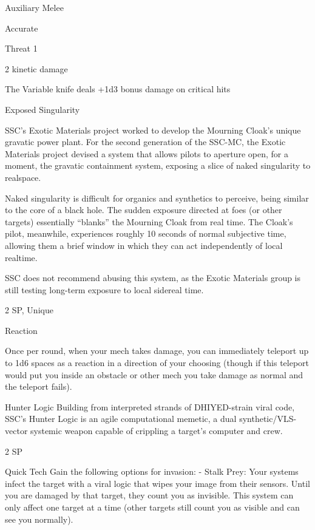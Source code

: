 Auxiliary Melee
 
Accurate
 
Threat 1
 
2 kinetic damage
 
The Variable knife deals +1d3 bonus damage on critical hits  

Exposed Singularity  

                                                                                                                   


SSC’s Exotic Materials project worked to develop the Mourning Cloak’s unique gravatic power plant. For the  
second generation of the SSC-MC, the Exotic Materials project devised a system that allows pilots to  
aperture open, for a moment, the gravatic containment system, exposing a slice of naked singularity to  
realspace.   

Naked singularity is difficult for organics and synthetics to perceive, being similar to the core of a black hole.  
The sudden exposure directed at foes (or other targets) essentially “blanks” the Mourning Cloak from real  
time. The Cloak’s pilot, meanwhile, experiences roughly 10 seconds of normal subjective time, allowing  
them a brief window in which they can act independently of local realtime.   

SSC does not recommend abusing this system, as the Exotic Materials group is still testing long-term  
exposure to local sidereal time.  

2 SP, Unique
 
Reaction
 
Once per round, when your mech takes damage, you can immediately teleport up to 1d6 spaces  
as a reaction in a direction of your choosing (though if this teleport would put you inside an  
obstacle or other mech you take damage as normal and the teleport fails).
 

Hunter Logic  
Building from interpreted strands of DHIYED-strain viral code, SSC’s Hunter Logic is an agile computational  
memetic, a dual synthetic/VLS-vector systemic weapon capable of crippling a target’s computer and crew.  

2 SP
 

Quick Tech  
Gain the following options for invasion:  
         - Stalk Prey: Your systems infect the target with a viral logic that wipes your image from  
their sensors. Until you are damaged by that target, they count you as invisible. This system can  
only affect one target at a time (other targets still count you as visible and can see you normally).
 
